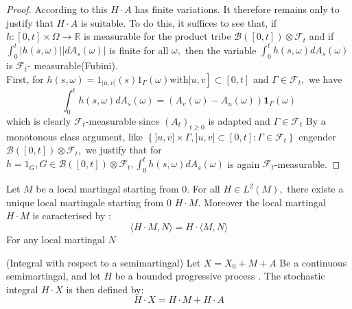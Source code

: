 	\begin{proof}
		According to this $H \cdot A $ has finite variations. It therefore remains only to justify that $ H \cdot A $ is suitable. %
		To do this, it suffices to see that, if $ h: [0, t] \times \Omega \rightarrow \mathbb{R} $ is measurable for the product tribe $ \mathcal{B} ([0, t]) \otimes \mathcal{F} _ {t} $ and if $ \int_ {0}^{t} | h (s, \omega) | \left | dA_ {s} (\omega) \right | $ is finite for all $ \omega, $ then the variable $ \int_ {0}^{t} h (s, \omega) d A_ {s} (\omega) $ is $ \mathcal{F}_{t}$-
		measurable(Fubini).\\
		First, for $ \left.h (s, \omega) = 1_ {| u, v]} (s) 1_ {\Gamma} (\omega) \text {with} | u, v \right] \subset [0, t] $ and $ \Gamma \in \mathcal{F}_{t}, $ we have
		$$
		\int_{0}^{t} h(s, \omega)dA_ {s} (\omega) = \left (A_ {v}(\omega)-A_{u}(\omega) \right) \mathbf{1}_{\Gamma} (\omega)
		$$
		which is clearly $ \mathcal{F}_{t}$-measurable since $\left(A_{t}\right)_{t \geq 0} $ is adapted and $ \Gamma \in \mathcal{F}_{t} $
		By a monotonous class argument, like $ \left\lbrace  ]u, v] \times \Gamma, ]u, v] \subset [0, t]: \Gamma \in \mathcal{F}_{t} \right\rbrace  $ engender $\mathcal{B}([0, t]) \otimes \mathcal{F}_{t}, $ we justify that for $h=1_ {G}, G \in \mathcal{B} ([0, t]) \otimes \mathcal{F}_{t}, \int_{0}^{t} h(s, \omega)dA_{s}(\omega)$ is
		again $\mathcal{F}_{t} $-measurable.
	\end{proof}
	\begin{theorem}
		Let $M$ be a local martingal starting from 0. For all $H \in L^{2}(M),$ there existe a unique local martingale starting from $0$ $H \cdot M .$ Moreover the local martingal $H \cdot M$ is caracterised by :
		$$
		\langle H \cdot M, N\rangle= H \cdot\langle M, N\rangle
		$$
		For any local martingal $N$
	\end{theorem}
	\begin{definition}
		(Integral with respect to a semimartingal) Let $X=X_{0}+M+A$ Be a continuous semimartingal, and let $H$ be a bounded progressive process . The stochastic integral $H \cdot X$ is then defined by:
		$$
		H \cdot X=H \cdot M+H \cdot A
		$$
	\end{definition}

